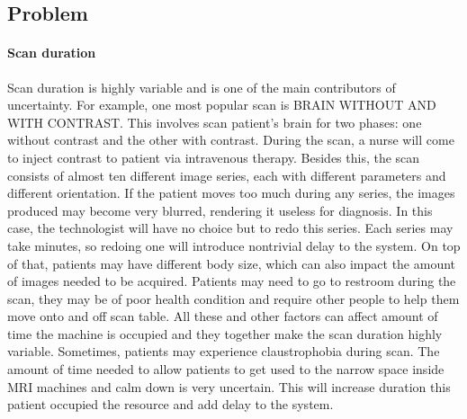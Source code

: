 \subsection{Problem}

\paragraph{Scan duration} Scan duration is highly variable and is one of the main contributors of uncertainty. For example, one most popular scan is BRAIN WITHOUT AND WITH CONTRAST. This involves scan patient's brain for two phases: one without contrast and the other with contrast. During the scan, a nurse will come to inject contrast to patient via intravenous therapy. Besides this, the scan consists of almost ten different image series, each with different parameters and different orientation. If the patient moves too much during any series, the images produced may become very blurred, rendering it useless for diagnosis. In this case, the technologist will have no choice but to redo this series. Each series may take minutes, so redoing one will introduce nontrivial delay to the system. On top of that, patients may have different body size, which can also impact the amount of images needed to be acquired. Patients may need to go to restroom during the scan, they may be of poor health condition and require other people to help them move onto and off scan table. All these and other factors can affect amount of time the machine is occupied and they together make the scan duration highly variable. Sometimes, patients may experience claustrophobia during scan. The amount of time needed to allow patients to get used to the narrow space inside MRI machines and calm down is very uncertain. This will increase duration this patient occupied the resource and add delay to the system.


